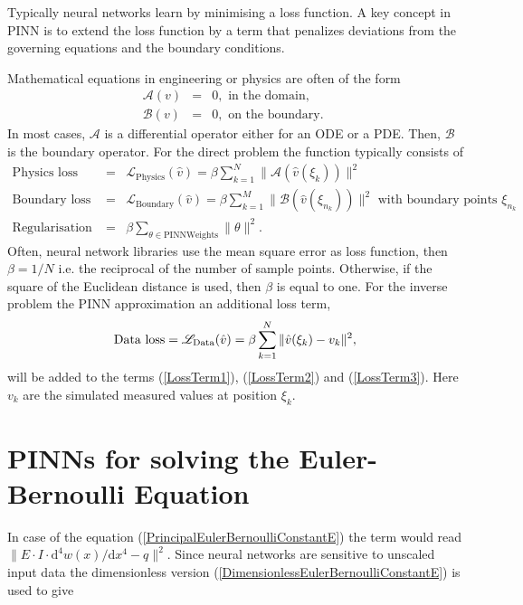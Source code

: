 \documentclass[a4paper,11pt]{article}
\begin{document}
Typically neural networks learn by minimising a loss function. A key concept in PINN is to extend the loss function by a term that penalizes deviations from the governing equations and the boundary conditions.

Mathematical equations in engineering or physics are often of the form
\begin{eqnarray*}
\mathscr{A} (v) &=& 0,\text{ in the domain,} \\
\mathscr{B} (v) &=& 0,\text{ on the boundary. }
\end{eqnarray*}
In most cases, $ \mathscr{A} $ is a differential operator either for an ODE or a PDE. Then, $ \mathscr{B} $ is the boundary operator. For the direct problem the function typically consists of
\begin{eqnarray} \label{LossTerm1}
\text{Physics loss } &=& \mathscr{L}_{\mathrm{Physics}} (\hat{v}) =\beta \sum_{k = 1}^N\| \mathscr{A} (\hat{v}(\xi_k) ) \|^2 \\
\text{Boundary loss} &=& \mathscr{L}_{\mathrm{Boundary}} (\hat{v}) = \beta \sum_{k = 1}^M\| \mathscr{B} (\hat{v}(\xi_{n_k}) ) \|^2 \text{ with boundary points  } \xi_{n_k} \label{LossTerm2}\\
\text{Regularisation term} &=& \beta \sum_{\theta \in \mathrm{PINN Weights}}  \| \theta \|^2 . \label{LossTerm3}
\end{eqnarray}
Often, neural network libraries use the mean square error as loss function, then $\beta = 1 /N  $ i.e. the reciprocal of the number of sample points. Otherwise, if the square of the Euclidean distance is used, then $\beta $ is equal to one.
For the inverse problem the PINN approximation an additional loss term,
\begin{equation*}
\text{Data loss} = \mathscr{L}_{\mathrm{Data}} (\hat{v})  = \beta \sum_{k = 1}^N \| \hat{v}(\xi_k)  - v_k \|^2 \\,
\end{equation*}
will be added to the terms (\ref{LossTerm1}),  (\ref{LossTerm2}) and (\ref{LossTerm3}). Here $ v_k $ are the simulated measured values at position $\xi_k $.

\section{PINNs for solving the Euler-Bernoulli Equation}
In case of the equation (\ref{PrincipalEulerBernoulliConstantE}) the term would read $\| E\cdot I \cdot \mathrm{d}^4 w(x) / \mathrm{d}x^4 - q \|^2 $. Since neural networks are sensitive to unscaled input data the dimensionless version (\ref{DimensionlessEulerBernoulliConstantE}) is used to give 
\end{document}
